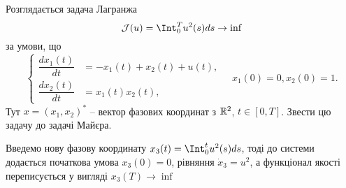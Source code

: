 \begin{problem}
	Розглядається задача Лагранжа
		\[
		\mathcal{J}(u)
		=
		\Int_0^T u^2(s) ds \to \inf
		\]
		за умови, що
		\[
			\left\{
				\begin{aligned}
					\dfrac{dx_1(t)}{dt} &= -x_1(t) + x_2(t) + u(t), \\
					\dfrac{dx_2(t)}{dt} &= x_1(t)x_2(t),
				\end{aligned}
			\right.
			\quad
			x_1(0)=0,x_2(0)=1.
		\]
		Тут $x=(x_1,x_2)^*$ -- вектор фазових координат з $\mathbb{R}^2$, $t\in[0,T]$. Звести цю задачу до задачі Майєра.
\end{problem}

\begin{solution}
	Введемо нову фазову координату $x_3(t)=\Int_0^t u^2(s) ds$, тоді до системи додається початкова умова $x_3(0)=0$, рівняння $\dot x_3 = u^2$, а функціонал якості переписується у вигляді $x_3(T) \to \inf$
\end{solution}
